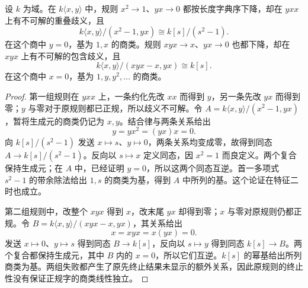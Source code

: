 \begin{proposition}\label{b2:prop:diamond-ambiguity-failures}
	设 \(k\) 为域。在 \(k\langle x,y\rangle\) 中，规则 \(x^2\to1\)、\(yx\to0\) 都按长度字典序下降，却在 \(yxx\) 上有不可解的重叠歧义，且
	\[
		k\langle x,y\rangle/(x^2-1,yx)\cong k[s]/(s^2-1).
	\]
	在这个商中 \(y=0\)，基为 \(1,x\) 的商类。规则 \(xyx\to x\)、\(yx\to0\) 也都下降，却在 \(xyx\) 上有不可解的包含歧义，且
	\[
		k\langle x,y\rangle/(xyx-x,yx)\cong k[s].
	\]
	在这个商中 \(x=0\)，基为 \(1,y,y^2,\ldots\) 的商类。
\end{proposition}
\begin{proof}
	第一组规则在 \(yxx\) 上，一条约化先改 \(xx\) 而得到 \(y\)，另一条先改 \(yx\) 而得到零；\(y\) 与零对于原规则都已正规，所以歧义不可解。令 \(A=k\langle x,y\rangle/(x^2-1,yx)\)，暂将生成元的商类仍记为 \(x,y\)。结合律与两条关系给出
	\[
		y=yx^2=(yx)x=0.
	\]
	向 \(k[s]/(s^2-1)\) 发送 \(x\mapsto s\)、\(y\mapsto0\)，两条关系均变成零，故得到同态 \(A\to k[s]/(s^2-1)\)。反向以 \(s\mapsto x\) 定义同态，因 \(x^2=1\) 而良定义。两个复合保持生成元；在 \(A\) 中，已经证明 \(y=0\)，所以这两个同态互逆。首一多项式 \(s^2-1\) 的带余除法给出 \(1,s\) 的商类为基，得到 \(A\) 中所列的基。这个论证在特征二时也成立。

	第二组规则中，改整个 \(xyx\) 得到 \(x\)，改末尾 \(yx\) 却得到零；\(x\) 与零对原规则仍都正规。令 \(B=k\langle x,y\rangle/(xyx-x,yx)\)，其关系给出
	\[
		x=xyx=x(yx)=0.
	\]
	发送 \(x\mapsto0\)、\(y\mapsto s\) 得到同态 \(B\to k[s]\)，反向以 \(s\mapsto y\) 得到同态 \(k[s]\to B\)。两个复合都保持生成元，其中 \(B\) 内的 \(x=0\)，所以它们互逆。\(k[s]\) 的幂基给出所列商类为基。两组失败都产生了原先终止结果未显示的额外关系，因此原规则的终止性没有保证正规字的商类线性独立。
\end{proof}
